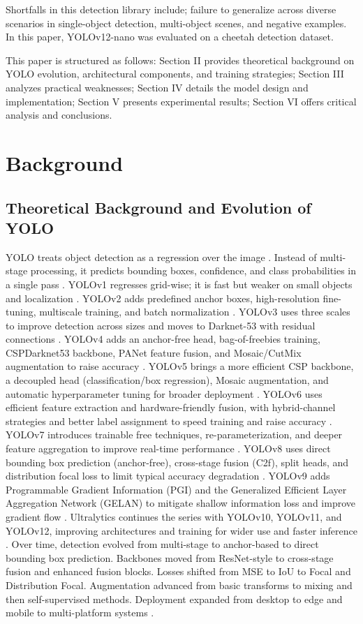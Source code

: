\documentclass[conference]{IEEEtran}
\begin{document}
Shortfalls in this detection library include; failure to generalize across diverse scenarios in single-object detection, multi-object scenes, and negative examples. In this paper, YOLOv12-nano was evaluated on a cheetah detection dataset.

This paper is structured as follows: Section II provides theoretical background on YOLO evolution, architectural components, and training strategies; Section III analyzes practical weaknesses; Section IV details the model design and implementation; Section V presents experimental results; Section VI offers critical analysis and conclusions.

\section{Background}

\subsection{Theoretical Background and Evolution of YOLO}

YOLO treats object detection as a regression over the image \cite{b1}. Instead of multi-stage processing, it predicts bounding boxes, confidence, and class probabilities in a single pass \cite{b1}. YOLOv1 regresses grid-wise; it is fast but weaker on small objects and localization \cite{b1}. YOLOv2 adds predefined anchor boxes, high-resolution fine-tuning, multiscale training, and batch normalization \cite{b2}. YOLOv3 uses three scales to improve detection across sizes and moves to Darknet-53 with residual connections \cite{b3}. YOLOv4 adds an anchor-free head, bag-of-freebies training, CSPDarknet53 backbone, PANet feature fusion, and Mosaic/CutMix augmentation to raise accuracy \cite{b3}. YOLOv5 brings a more efficient CSP backbone, a decoupled head (classification/box regression), Mosaic augmentation, and automatic hyperparameter tuning for broader deployment \cite{b3}. YOLOv6 uses efficient feature extraction and hardware-friendly fusion, with hybrid-channel strategies and better label assignment to speed training and raise accuracy \cite{b3}. YOLOv7 introduces trainable free techniques, re-parameterization, and deeper feature aggregation to improve real-time performance \cite{b3}. YOLOv8 uses direct bounding box prediction (anchor-free), cross-stage fusion (C2f), split heads, and distribution focal loss to limit typical accuracy degradation \cite{b3}. YOLOv9 adds Programmable Gradient Information (PGI) and the Generalized Efficient Layer Aggregation Network (GELAN) to mitigate shallow information loss and improve gradient flow \cite{b3}. Ultralytics continues the series with YOLOv10, YOLOv11, and YOLOv12, improving architectures and training for wider use and faster inference \cite{b3}. Over time, detection evolved from multi-stage to anchor-based to direct bounding box prediction. Backbones moved from ResNet-style to cross-stage fusion and enhanced fusion blocks. Losses shifted from MSE to IoU to Focal and Distribution Focal. Augmentation advanced from basic transforms to mixing and then self-supervised methods. Deployment expanded from desktop to edge and mobile to multi-platform systems \cite{b3}.
\end{document}
